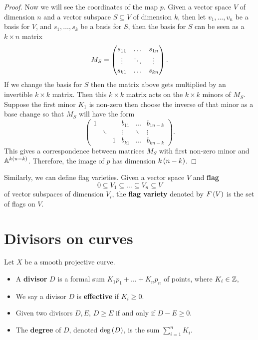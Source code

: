 \begin{proof}
Now we will see the coordinates of the map $ p $. Given a vector space $ V $ of dimension $ n $ and a vector subspace $ S \subseteq V $ of dimension $ k $, then let $ v_1, \dots, v_n $ be a basis for $ V $, and $ s_1, \dots, s_k $ be a basis for $ S $, then the basis for $ S $ can be seen as a $ k \times n $ matrix
$$ M_S = \threebythree{s_{11}}{\dots}{s_{1n}}{\vdots}{\ddots}{\vdots}{s_{k1}}{\dots}{s_{kn}}. $$
If we change the basis for $ S $ then the matrix above gets multiplied by an invertible $ k \times k $ matrix. Then this $ k \times k $ matrix acts on the $ k \times k $ minors of $ M_S $. Suppose the first minor $ K_1 $ is non-zero then choose the inverse of that minor as a base change so that $ M_S $ will have the form
$$
\begin{pmatrix}
1 & & & b_{11} & \dots & b_{1n - k} \\
& \ddots & & \vdots & \ddots & \vdots \\
& & 1 & b_{k1} & \dots & b_{kn - k}
\end{pmatrix}.
$$
This gives a correspondence between matrices $ M_S $ with first non-zero minor and $ \mathbb{A}^{k\left( n - k \right)} $. Therefore, the image of $ p $ has dimension $ k\left( n - k \right) $.
\end{proof}

Similarly, we can define flag varieties. Given a vector space $ V $ and \textbf{flag}
$$ 0 \subseteq V_1 \subseteq \dots \subseteq V_n \subseteq V $$
of vector subspaces of dimension $ V_i $, the \textbf{flag variety} denoted by $ F\left( V \right) $ is the set of flags on $ V $.

\pagebreak

\section{Divisors on curves}


\begin{definition}
Let $ X $ be a smooth projective curve.
\begin{itemize}
\item A \textbf{divisor} $ D $ is a formal sum $ K_1p_1 + \dots + K_np_n $ of points, where $ K_i \in \mathbb{Z} $,
\item We say a divisor $ D $ is \textbf{effective} if $ K_i \ge 0 $.
\item Given two divisors $ D, E $, $ D \ge E $ if and only if $ D - E \ge 0 $.
\item The \textbf{degree} of $ D $, denoted $ \deg\left( D \right) $, is the sum $ \sum_{i = 1}^n K_i $.
\end{itemize}
\end{definition}

